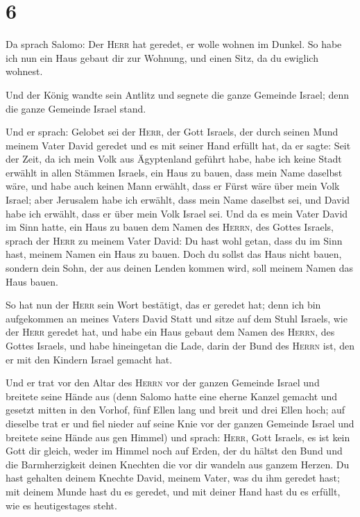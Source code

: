 \hypertarget{section-1}{%
\section{6}\label{section-1}}

 Da sprach Salomo: Der \textsc{Herr} hat geredet, er wolle
wohnen im Dunkel.  So habe ich nun ein Haus gebaut dir zur
Wohnung, und einen Sitz, da du ewiglich wohnest.

 Und der König wandte sein Antlitz und segnete die ganze
Gemeinde Israel; denn die ganze Gemeinde Israel stand.

 Und er sprach: Gelobet sei der \textsc{Herr}, der Gott
Israels, der durch seinen Mund meinem Vater David geredet und es mit
seiner Hand erfüllt hat, da er sagte:  Seit der Zeit, da
ich mein Volk aus Ägyptenland geführt habe, habe ich keine Stadt erwählt
in allen Stämmen Israels, ein Haus zu bauen, dass mein Name daselbst
wäre, und habe auch keinen Mann erwählt, dass er Fürst wäre über mein
Volk Israel;  aber Jerusalem habe ich erwählt, dass mein
Name daselbst sei, und David habe ich erwählt, dass er über mein Volk
Israel sei.  Und da es mein Vater David im Sinn hatte, ein
Haus zu bauen dem Namen des \textsc{Herrn}, des Gottes Israels,
 sprach der \textsc{Herr} zu meinem Vater David: Du hast
wohl getan, dass du im Sinn hast, meinem Namen ein Haus zu bauen.
 Doch du sollst das Haus nicht bauen, sondern dein Sohn,
der aus deinen Lenden kommen wird, soll meinem Namen das Haus bauen.

 So hat nun der \textsc{Herr} sein Wort bestätigt, das er
geredet hat; denn ich bin aufgekommen an meines Vaters David Statt und
sitze auf dem Stuhl Israels, wie der \textsc{Herr} geredet hat, und habe
ein Haus gebaut dem Namen des \textsc{Herrn}, des Gottes Israels,
 und habe hineingetan die Lade, darin der Bund des
\textsc{Herrn} ist, den er mit den Kindern Israel gemacht hat.

 Und er trat vor den Altar des \textsc{Herrn} vor der
ganzen Gemeinde Israel und breitete seine Hände aus 
(denn Salomo hatte eine eherne Kanzel gemacht und gesetzt mitten in den
Vorhof, fünf Ellen lang und breit und drei Ellen hoch; auf dieselbe trat
er und fiel nieder auf seine Knie vor der ganzen Gemeinde Israel und
breitete seine Hände aus gen Himmel)  und sprach:
\textsc{Herr}, Gott Israels, es ist kein Gott dir gleich, weder im
Himmel noch auf Erden, der du hältst den Bund und die Barmherzigkeit
deinen Knechten die vor dir wandeln aus ganzem Herzen. 
Du hast gehalten deinem Knechte David, meinem Vater, was du ihm geredet
hast; mit deinem Munde hast du es geredet, und mit deiner Hand hast du
es erfüllt, wie es heutigestages steht.

